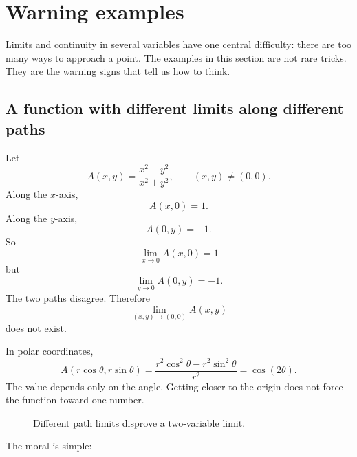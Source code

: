 \section{Warning examples}
\label{sec:6.5}

Limits and continuity in several variables have one central difficulty: there are too many
ways to approach a point.  The examples in this section are not rare tricks.  They are
the warning signs that tell us how to think.

\subsection{A function with different limits along different paths}

Let
\[
    A(x,y)=\frac{x^2-y^2}{x^2+y^2},
    \qquad (x,y)\ne(0,0).
\]
Along the \(x\)-axis,
\[
    A(x,0)=1.
\]
Along the \(y\)-axis,
\[
    A(0,y)=-1.
\]
So
\[
    \lim_{x\to0}A(x,0)=1
\]
but
\[
    \lim_{y\to0}A(0,y)=-1.
\]
The two paths disagree.  Therefore
\[
    \lim_{(x,y)\to(0,0)}A(x,y)
\]
does not exist.

In polar coordinates,
\[
    A(r\cos\theta,r\sin\theta)
    =
    \frac{r^2\cos^2\theta-r^2\sin^2\theta}{r^2}
    =
    \cos(2\theta).
\]
The value depends only on the angle.  Getting closer to the origin does not force the
function toward one number.

\begin{figure}[h]
\centering
{}
\caption{Different path limits disprove a two-variable limit.}
\end{figure}

The moral is simple:

